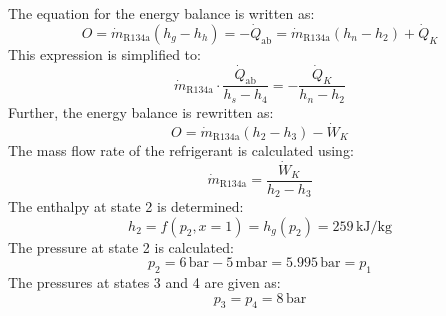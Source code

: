 The equation for the energy balance is written as:  
\[
O = \dot{m}_{\text{R134a}} (h_g - h_h) = -\dot{Q}_{\text{ab}} = \dot{m}_{\text{R134a}} (h_n - h_2) + \dot{Q}_K
\]  
This expression is simplified to:  
\[
\dot{m}_{\text{R134a}} \cdot \frac{\dot{Q}_{\text{ab}}}{h_s - h_4} = -\frac{\dot{Q}_K}{h_n - h_2}
\]  
Further, the energy balance is rewritten as:  
\[
O = \dot{m}_{\text{R134a}} (h_2 - h_3) - \dot{W}_K
\]  
The mass flow rate of the refrigerant is calculated using:  
\[
\dot{m}_{\text{R134a}} = \frac{\dot{W}_K}{h_2 - h_3}
\]  
The enthalpy at state 2 is determined:  
\[
h_2 = f(p_2, x=1) = h_g(p_2) = 259 \, \text{kJ/kg}
\]  
The pressure at state 2 is calculated:  
\[
p_2 = 6 \, \text{bar} - 5 \, \text{mbar} = 5.995 \, \text{bar} = p_1
\]  
The pressures at states 3 and 4 are given as:  
\[
p_3 = p_4 = 8 \, \text{bar}
\]